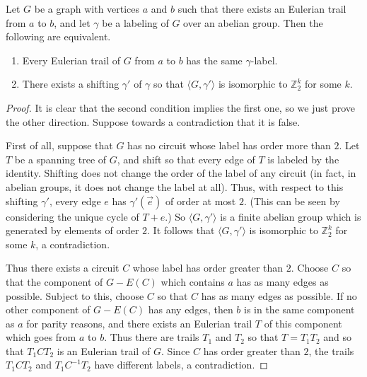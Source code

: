 \documentclass[a4paper, 12pt]{article}
\begin{document}
\begin{lemma}
\label{lem:abelian}
Let $G$ be a graph with vertices $a$ and $b$ such that there exists an Eulerian trail from $a$ to $b$, and let $\gamma$ be a labeling of $G$ over an abelian group. Then the following are equivalent.\begin{enumerate}
    \item Every Eulerian trail of $G$ from $a$ to $b$ has the same $\gamma$-label.
    \item There exists a shifting $\gamma'$ of $\gamma$ so that $\langle G, \gamma' \rangle$ is isomorphic to $\mathbb{Z}_2^k$ for some $k$.
\end{enumerate}
\end{lemma}
\begin{proof}
    It is clear that the second condition implies the first one, so we just prove the other direction. Suppose towards a contradiction that it is false.

    First of all, suppose that $G$ has no circuit whose label has order more than $2$. Let $T$ be a spanning tree of $G$, and shift so that every edge of $T$ is labeled by the identity. Shifting does not change the order of the label of any circuit (in fact, in abelian groups, it does not change the label at all). Thus, with respect to this shifting $\gamma'$, every edge $e$ has $\gamma'(\vec{e})$ of order at most $2$. (This can be seen by considering the unique cycle of $T+e$.) So $\langle G, \gamma' \rangle$ is a finite abelian group which is generated by elements of order $2$. It follows that $\langle G, \gamma' \rangle$ is isomorphic to $\mathbb{Z}_2^k$ for some $k$, a contradiction.

    Thus there exists a circuit $C$ whose label has order greater than $2$. Choose $C$ so that the component of $G-E(C)$ which contains $a$ has as many edges as possible. Subject to this, choose $C$ so that $C$ has as many edges as possible. If no other component of $G-E(C)$ has any edges, then $b$ is in the same component as $a$ for parity reasons, and there exists an Eulerian trail $T$ of this component which goes from $a$ to $b$. Thus there are trails $T_1$ and $T_2$ so that $T=T_1 T_2$ and so that $T_1 C T_2$ is an Eulerian trail of $G$. Since $C$ has order greater than $2$, the trails $T_1 C T_2$ and $T_1 C^{-1} T_2$ have different labels, a contradiction.


\end{proof}
\end{document}
